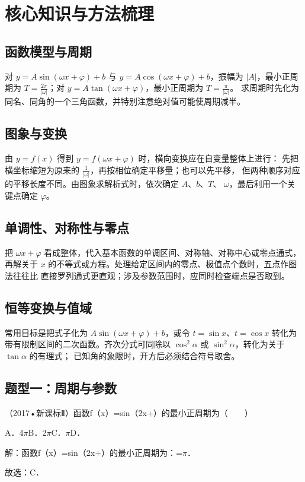 
\section{核心知识与方法梳理}

\subsection{函数模型与周期}
对 $y=A\sin(\omega x+\varphi)+b$ 与 $y=A\cos(\omega x+\varphi)+b$，振幅为
$|A|$，最小正周期为 $T=\frac{2\pi}{|\omega|}$；对
$y=A\tan(\omega x+\varphi)$，最小正周期为 $T=\frac{\pi}{|\omega|}$。
求周期时先化为同名、同角的一个三角函数，并特别注意绝对值可能使周期减半。

\subsection{图象与变换}
由 $y=f(x)$ 得到 $y=f(\omega x+\varphi)$ 时，横向变换应在自变量整体上进行：
先把横坐标缩短为原来的 $\frac1{|\omega|}$，再按相位确定平移量；也可以先平移，
但两种顺序对应的平移长度不同。由图象求解析式时，依次确定 $A$、$b$、$T$、
$\omega$，最后利用一个关键点确定 $\varphi$。

\subsection{单调性、对称性与零点}
把 $\omega x+\varphi$ 看成整体，代入基本函数的单调区间、对称轴、对称中心或零点通式，
再解关于 $x$ 的不等式或方程。处理给定区间内的零点、极值点个数时，五点作图法往往比
直接罗列通式更直观；涉及参数范围时，应同时检查端点是否取到。

\subsection{恒等变换与值域}
常用目标是把式子化为 $A\sin(\omega x+\varphi)+b$，或令
$t=\sin x$、$t=\cos x$ 转化为带有限制区间的二次函数。齐次分式可同除以
$\cos^2\alpha$ 或 $\sin^2\alpha$，转化为关于 $\tan\alpha$ 的有理式；
已知角的象限时，开方后必须结合符号取舍。

\subsection{题型一：周期与参数}

\begin{question}
（2017•新课标Ⅱ）函数f（x）=sin（2x+）的最小正周期为（　　）\par
A．4\ensuremath{\pi}\qquad{}B．2\ensuremath{\pi}\qquad{}C．\ensuremath{\pi}\qquad{}D．\par
\begin{solution}
解：函数f（x）=sin（2x+）的最小正周期为：=\ensuremath{\pi}．\par
故选：C．\par
\end{solution}
\end{question}

